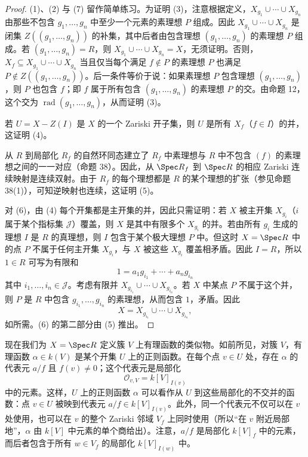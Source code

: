 \begin{proof}
	(1)、(2) 与 (7) 留作简单练习。为证明 (3)，注意根据定义，$X_{g_1}\cup\cdots\cup X_{g_n}$ 由那些不包含 $g_1,\ldots,g_n$ 中至少一个元素的素理想 $P$ 组成。因此 $X_{g_1}\cup\cdots\cup X_{g_n}$ 是闭集 $Z((g_1,\ldots,g_n))$ 的补集，其中后者由包含理想 $(g_1,\ldots,g_n)$ 的素理想 $P$ 组成。若 $(g_1,\ldots,g_n)=R$，则 $X_{g_1}\cup\cdots\cup X_{g_n}=X$，无须证明。否则，$X_f\subseteq X_{g_1}\cup\cdots\cup X_{g_n}$ 当且仅当每个满足 $f\notin P$ 的素理想 $P$ 也满足 $P\notin Z((g_1,\ldots,g_n))$。后一条件等价于说：如果素理想 $P$ 包含理想 $(g_1,\ldots,g_n)$，则 $P$ 也包含 $f$；即 $f$ 属于所有包含 $(g_1,\ldots,g_n)$ 的素理想 $P$ 的交。由命题 12，这个交为 $\operatorname{rad}(g_1,\ldots,g_n)$，从而证明 (3)。
	
	若 $U=X-Z(I)$ 是 $X$ 的一个 Zariski 开子集，则 $U$ 是所有 $X_f$（$f\in I$）的并，这证明 (4)。
	
	从 $R$ 到局部化 $R_f$ 的自然环同态建立了 $R_f$ 中素理想与 $R$ 中不包含 $(f)$ 的素理想之间的一一对应（命题 38）。因此，从 $\Spec R_f$ 到 $\Spec R$ 的相应 Zariski 连续映射是连续双射。由于 $R_f$ 的每个理想都是 $R$ 的某个理想的扩张（参见命题 38(1)），可知逆映射也连续，这证明 (5)。
	
	对 (6)，由 (4) 每个开集都是主开集的并，因此只需证明：若 $X$ 被主开集 $X_{g_i}$（$i$ 属于某个指标集 $\mathcal J$）覆盖，则 $X$ 是其中有限多个 $X_{g_i}$ 的并。若由所有 $g_i$ 生成的理想 $I$ 是 $R$ 的真理想，则 $I$ 包含于某个极大理想 $P$ 中。但这时 $X=\Spec R$ 中的点 $P$ 不属于任何主开集 $X_{g_i}$，与 $X$ 被这些 $X_{g_i}$ 覆盖相矛盾。因此 $I=R$，所以 $1\in R$ 可写为有限和
	\[
	1=a_1g_{i_1}+\cdots+a_ng_{i_n}
	\]
	其中 $i_1,\ldots,i_n\in\mathcal J$。考虑有限并 $X_{g_{i_1}}\cup\cdots\cup X_{g_{i_n}}$。若 $X$ 中某点 $P$ 不属于这个并，则 $P$ 是 $R$ 中包含 $g_{i_1},\ldots,g_{i_n}$ 的素理想，从而包含 $1$，矛盾。因此
	\[
	X=X_{g_{i_1}}\cup\cdots\cup X_{g_{i_n}},
	\]
	如所需。(6) 的第二部分由 (5) 推出。
\end{proof}

现在我们为 $X=\Spec R$ 定义簇 $V$ 上有理函数的类似物。如前所见，对簇 $V$，有理函数 $\alpha\in k(V)$ 是某个开集 $U$ 上的正则函数。在每个点 $v\in U$ 处，存在 $\alpha$ 的代表元 $a/f$ 且 $f(v)\ne0$；这个代表元是局部化
\[
\mathcal O_{v,V}=k[V]_{I(v)}
\]
中的元素。这样，$U$ 上的正则函数 $\alpha$ 可以看作从 $U$ 到这些局部化的不交并的函数：点 $v\in U$ 被映到代表元 $a/f\in k[V]_{I(v)}$。此外，同一个代表元不仅可以在 $v$ 处使用，也可以在 $v$ 的整个 Zariski 邻域 $V_f$ 上同时使用（所以“在 $v$ 附近局部地”，$\alpha$ 由 $k[V]$ 中元素的单个商给出）。注意，$a/f$ 是局部化 $k[V]_f$ 中的元素，而后者包含于所有 $w\in V_f$ 的局部化 $k[V]_{I(w)}$ 中。


